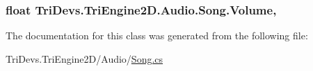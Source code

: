 \hypertarget{class_tri_devs_1_1_tri_engine2_d_1_1_audio_1_1_song_adee5d7e1dfa7870600b7a3433ce0dc18}{
\subsubsection[{Volume}]{\setlength{\rightskip}{0pt plus 5cm}float Tri\-Devs.\-Tri\-Engine2\-D.\-Audio.\-Song.\-Volume\hspace{0.3cm}{\ttfamily [get]}, {\ttfamily [set]}}}\label{class_tri_devs_1_1_tri_engine2_d_1_1_audio_1_1_song_adee5d7e1dfa7870600b7a3433ce0dc18}


The documentation for this class was generated from the following file\-:\begin{DoxyCompactItemize}
\item 
Tri\-Devs.\-Tri\-Engine2\-D/\-Audio/\hyperlink{_song_8cs}{Song.\-cs}\end{DoxyCompactItemize}
